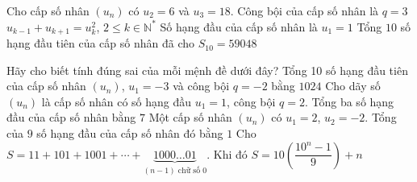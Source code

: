 \begin{ex}%
	Cho cấp số nhân $(u_n)$ có $u_2=6$ và  $u_3=18$.
	 \choiceTF
		{\True  Công bội của cấp số nhân là $q=3$}
		{$u_{k-1}+u_{k+1}=u_k^2$, $2 \le k \in \mathbb{N}^*$} 
		{Số hạng đầu của cấp số nhân  là $u_1=1$}
		{\True Tổng $10$ số hạng đầu tiên của cấp số nhân đã  cho $S_{10}=59048$}
\end{ex}

\begin{ex}%
  Hãy cho biết tính đúng sai của mỗi mệnh đề dưới đây?
 \choiceTF 
  {Tổng 10 số hạng  đầu tiên của cấp số nhân $(u_n)$, $u_1=-3$ và công bội $q=-2$ bằng $1024$}
  {\True Cho dãy số $(u_n)$  là cấp số nhân có số hạng đầu $u_1=1$, công bội $q=2$. Tổng ba số hạng đầu của cấp số nhân bằng $7$}
  {Một  cấp số nhân $(u_n)$ có $u_1=2$, $u_2=-2$. Tổng của $9$ số hạng đầu của cấp số nhân đó bằng $1$}
  {Cho  $S=11+101+1001+\cdots +\underbrace{1000\ldots 01}_{(n-1)\text{ chữ số 0}}$. Khi đó $S=10\left(\dfrac{10^n-1}{9}\right)+n$}
\end{ex}

